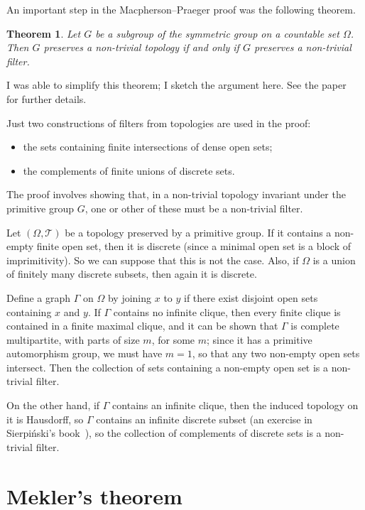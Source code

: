 \documentclass[12pt]{article}
\newtheorem{theorem}{Theorem}[section]
\begin{document}
An important step in the Macpherson--Praeger proof was the following theorem.

\begin{theorem}
Let $G$ be a subgroup of the symmetric group on a countable set $\Omega$. Then
$G$ preserves a non-trivial topology if and only if $G$ preserves a
non-trivial filter.
\end{theorem}

I was able to simplify this theorem; I sketch the argument here. See the
paper~\cite{topsym} for further details.

Just two constructions of filters from topologies are used in the proof:
\begin{itemize}
\item the sets containing finite intersections of dense open sets;
\item the complements of finite unions of discrete sets.
\end{itemize}
The proof involves showing that, in a non-trivial topology invariant under the
primitive group $G$, one or other of these must be a non-trivial filter.

Let $(\Omega,\mathcal{T})$ be a  topology preserved by a primitive group.
If it contains a non-empty finite open set, then it is discrete (since a
minimal open set is a block of imprimitivity). So we can suppose that this is
not the case. Also, if $\Omega$ is a union of finitely many discrete subsets,
then again it is discrete.

Define a graph $\Gamma$ on $\Omega$ by joining $x$ to $y$ if there exist
disjoint open sets containing $x$ and $y$. If $\Gamma$ contains no infinite
clique, then every finite clique is contained in a finite maximal clique,
and it can be shown that $\Gamma$ is complete multipartite, with parts of size
$m$, for some $m$; since it has a primitive automorphism group, we must have
$m=1$, so that any two non-empty open sets intersect. Then the collection of
sets containing a non-empty open set is a non-trivial filter.

On the other hand, if $\Gamma$ contains an infinite clique, then the induced
topology on it is Hausdorff, so $\Gamma$ contains an infinite discrete subset
(an exercise in Sierpi\'nski's book~\cite{sierpinski}), so the collection of
complements of discrete sets is a non-trivial filter.

\section{Mekler's theorem}
\end{document}
